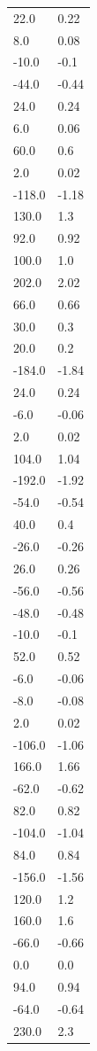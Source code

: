 \begin{longtable}{ll}
22.0 & 0.22 \\
8.0 & 0.08 \\
-10.0 & -0.1 \\
-44.0 & -0.44 \\
24.0 & 0.24 \\
6.0 & 0.06 \\
60.0 & 0.6 \\
2.0 & 0.02 \\
-118.0 & -1.18 \\
130.0 & 1.3 \\
92.0 & 0.92 \\
100.0 & 1.0 \\
202.0 & 2.02 \\
66.0 & 0.66 \\
30.0 & 0.3 \\
20.0 & 0.2 \\
-184.0 & -1.84 \\
24.0 & 0.24 \\
-6.0 & -0.06 \\
2.0 & 0.02 \\
104.0 & 1.04 \\
-192.0 & -1.92 \\
-54.0 & -0.54 \\
40.0 & 0.4 \\
-26.0 & -0.26 \\
26.0 & 0.26 \\
-56.0 & -0.56 \\
-48.0 & -0.48 \\
-10.0 & -0.1 \\
52.0 & 0.52 \\
-6.0 & -0.06 \\
-8.0 & -0.08 \\
2.0 & 0.02 \\
-106.0 & -1.06 \\
166.0 & 1.66 \\
-62.0 & -0.62 \\
82.0 & 0.82 \\
-104.0 & -1.04 \\
84.0 & 0.84 \\
-156.0 & -1.56 \\
120.0 & 1.2 \\
160.0 & 1.6 \\
-66.0 & -0.66 \\
0.0 & 0.0 \\
94.0 & 0.94 \\
-64.0 & -0.64 \\
230.0 & 2.3 \\

\end{longtable}
